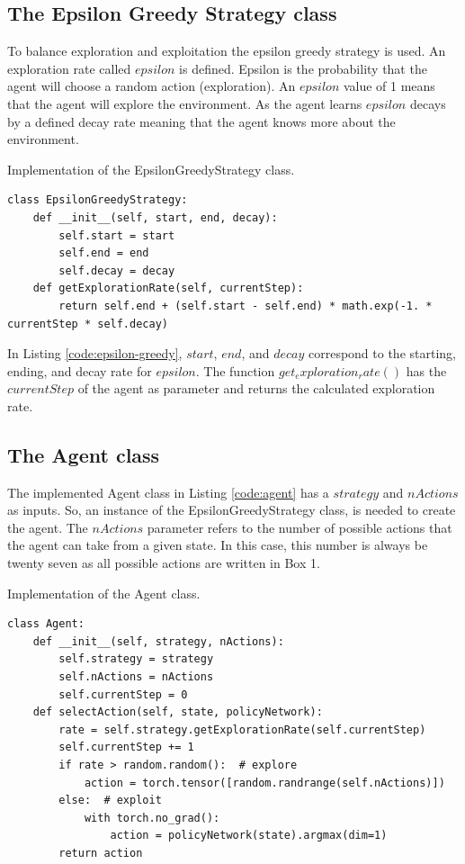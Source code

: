 \documentclass[12pt,oneside]{article}
\begin{document}
\subsection{The Epsilon Greedy Strategy class}
To balance exploration and exploitation the epsilon greedy strategy is used. An exploration rate called $epsilon$ is defined. Epsilon is the probability that the agent will choose a random action (exploration). An $epsilon$ value of 1 means that the agent will explore the environment. As the agent learns $epsilon$ decays by a defined decay rate meaning that the agent knows more about the environment.
\begin{listing}[H]
\caption{Implementation of the EpsilonGreedyStrategy class.}
\label{code:epsilon-greedy}
\begin{verbatim}
class EpsilonGreedyStrategy:
    def __init__(self, start, end, decay):
        self.start = start
        self.end = end
        self.decay = decay
    def getExplorationRate(self, currentStep):
        return self.end + (self.start - self.end) * math.exp(-1. * currentStep * self.decay)
\end{verbatim}
\end{listing} 
In Listing \ref{code:epsilon-greedy}, $start$, $end$, and $decay$ correspond to the starting, ending, and decay rate for $epsilon$. The function $get_exploration_rate()$ has the $currentStep$ of the agent as parameter and returns the calculated exploration rate.

\subsection{The Agent class}
The implemented Agent class in Listing \ref{code:agent} has a $strategy$ and $nActions$ as inputs. So, an instance of the EpsilonGreedyStrategy class, is needed to create the agent. The $nActions$ parameter refers to the number of possible actions that the agent can take from a given state. In this case, this number is always be twenty seven as all possible actions are written in Box 1.

\begin{listing}[H]
\caption{Implementation of the Agent class.}
\label{code:agent}
\begin{verbatim}
class Agent:
    def __init__(self, strategy, nActions):
        self.strategy = strategy
        self.nActions = nActions
        self.currentStep = 0
    def selectAction(self, state, policyNetwork):
        rate = self.strategy.getExplorationRate(self.currentStep)
        self.currentStep += 1
        if rate > random.random():  # explore
            action = torch.tensor([random.randrange(self.nActions)])
        else:  # exploit
        	with torch.no_grad():
            	action = policyNetwork(state).argmax(dim=1)
        return action
\end{verbatim}
\end{listing} 
\end{document}
